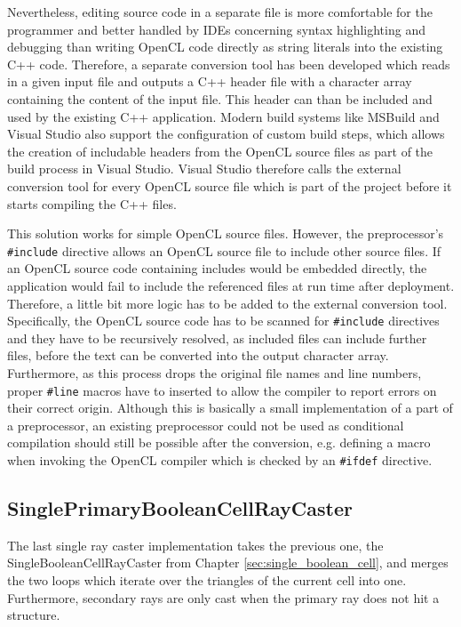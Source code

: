 Nevertheless, editing source code in a separate file is more comfortable for the programmer and better handled by IDEs concerning syntax highlighting and debugging than writing OpenCL code directly as string literals into the existing C++ code. Therefore, a separate conversion tool has been developed which reads in a given input file and outputs a C++ header file with a character array containing the content of the input file. This header can than be included and used by the existing C++ application. Modern build systems like MSBuild and Visual Studio also support the configuration of custom build steps, which allows the creation of includable headers from the OpenCL source files as part of the build process in Visual Studio. Visual Studio therefore calls the external conversion tool for every OpenCL source file which is part of the project before it starts compiling the C++ files.

This solution works for simple OpenCL source files. However, the preprocessor's \lstinline!#include! directive allows an OpenCL source file to include other source files. If an OpenCL source code containing includes would be embedded directly, the application would fail to include the referenced files at run time after deployment. Therefore, a little bit more logic has to be added to the external conversion tool. Specifically, the OpenCL source code has to be scanned for \lstinline!#include! directives and they have to be recursively resolved, as included files can include further files, before the text can be converted into the output character array. Furthermore, as this process drops the original file names and line numbers, proper \lstinline!#line! macros have to inserted to allow the compiler to report errors on their correct origin. Although this is basically a small implementation of a part of a preprocessor, an existing preprocessor could not be used as conditional compilation should still be possible after the conversion, e.g. defining a macro when invoking the OpenCL compiler which is checked by an \lstinline!#ifdef! directive.


\subsection{SinglePrimaryBooleanCellRayCaster}
\label{sec:single_primary}

The last single ray caster implementation takes the previous one, the SingleBooleanCellRayCaster from Chapter \ref{sec:single_boolean_cell}, and merges the two loops which iterate over the triangles of the current cell into one. Furthermore, secondary rays are only cast when the primary ray does not hit a structure.

